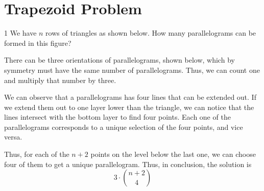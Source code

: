 \section{Trapezoid Problem}
\begin{problem}
	1 We have $n$ rows of triangles as shown below. How many parallelograms can be formed in this figure?
\end{problem}
\begin{figure}[h]
\centering
\end{figure}
\begin{solution}
There can be three orientations of parallelograms, shown below, which by symmetry must have the same number of parallelograms. Thus, we can count one and multiply that number by three.
\begin{figure}[H]
\centering
\end{figure}
We can observe that a parallelograms has four lines that can be extended out. If we extend them out to one layer lower than the triangle, we can notice that the lines intersect with the bottom layer to find four points. Each one of the parallelograms corresponds to a unique selection of the four points, and vice versa.
\begin{figure}[H]
\centering
\end{figure}
Thus, for each of the $n+2$ points on the level below the last one, we can choose four of them to get a unique parallelogram. Thus, in conclusion, the solution is \[3\cdot{n+2 \choose 4}\]
\end{solution}
